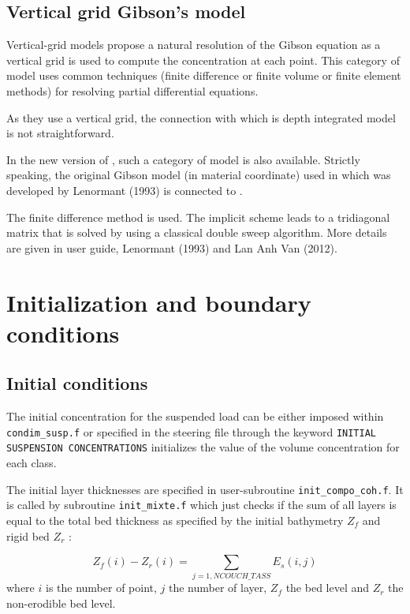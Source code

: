 \subsection{Vertical grid Gibson's model}\label{sec:4.4}
Vertical-grid models propose a natural resolution of the Gibson equation
as a vertical grid is used to compute the concentration at each point. This
category of model uses common techniques (finite difference or finite volume
or finite element methods) for resolving partial differential equations.

As they use a vertical grid, the connection with \sisyphe which is depth
integrated model is not straightforward.

In the new version of \sisyphe, such a category of model is also available.
Strictly speaking, the original Gibson model (in material coordinate) used
in \telddd which was developed by Lenormant (1993) is connected to
\sisyphe.

The finite difference method is used. The implicit scheme leads to a
tridiagonal matrix that is solved by using a classical double sweep
algorithm. More details are given in \telddd user guide, Lenormant
(1993) and Lan Anh Van (2012).



\section{Initialization and boundary conditions}

\subsection{Initial conditions}
The initial concentration for the suspended load can be either imposed
within \texttt{condim\_susp.f} or specified in the steering file through the keyword
\texttt{INITIAL SUSPENSION CONCENTRATIONS} initializes the value of the volume
concentration for each class.

The initial layer thicknesses are specified in user-subroutine
\texttt{init\_compo\_coh.f}. It is called by subroutine \texttt{init\_mixte.f} which just checks
if the sum of all layers is equal to the total bed thickness as specified by
the initial bathymetry $Z_f$ and rigid bed $Z_r$ :

\begin{equation}\label{eq_test}
Z_f(i) - Z_r(i) = \sum_{j=1,NCOUCH\_TASS}E_s(i,j) 
\end{equation}
where $i$ is the number of point, $j$ the number of layer, $Z_f$ the bed level and $Z_r$ the non-erodible bed level.

